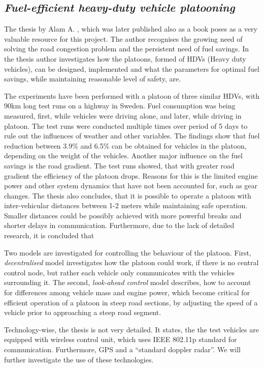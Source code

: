 
\subsection{\textit{Fuel-efficient heavy-duty vehicle platooning}}
The thesis by Alam A. \cite{Alam2014Fuel-efficientPlatooning}, which was later published also as a book poses as a very valuable resource for this project. The author recognises the growing need of solving the road congestion problem and the persistent need of fuel savings. In the thesis author investigates how the platoons, formed of HDVs (Heavy duty vehicles), can be designed, implemented and what the parameters for optimal fuel savings, while maintaining reasonable level of safety, are.\par
% 
% 
The experiments have been performed with a platoon of three similar HDVs, with 90km long test runs on a highway in Sweden. Fuel consumption was being measured, first, while vehicles were driving alone, and later, while driving in platoon. The test runs were conducted multiple times over period of 5 days to rule out the influences of weather and other variables. The findings show that fuel reduction between 3.9\% and 6.5\% can be obtained for vehicles in the platoon, depending on the weight of the vehicles. Another major influence on the fuel savings is the road gradient. The test runs showed, that with greater road gradient the efficiency of the platoon drops. Reasons for this is the limited engine power and other system dynamics that have not been accounted for, such as gear changes. The thesis also concludes, that it is possible to operate a platoon with inter-vehicular distances between 1-2 meters while maintaining safe operation. Smaller distances could be possibly achieved with more powerful breaks and shorter delays in communication. Furthermore, due to the lack of detailed research, it is concluded that 
\par
% 
Two models are investigated for controlling the behaviour of the platoon. First, \emph{decentralised} model investigates how the platoon could work, if there is no central control node, but rather each vehicle only communicates with the vehicles surrounding it. The second, \emph{look-ahead control} model describes, how to account for differences among vehicle mass and engine power, which become critical for efficient operation of a platoon in steep road sections, by adjusting the speed of a vehicle prior to approaching a steep road segment.
\par
% 
Technology-wise, the thesis is not very detailed. It states, the the test vehicles are equipped with wireless control unit, which uses IEEE 802.11p standard for communication. Furthermore, GPS and a \enquote{standard doppler radar}. We will further investigate the use of these technologies.
% 
% 
%
